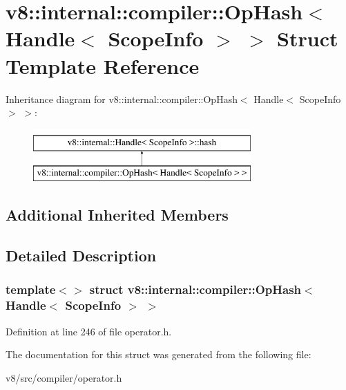 \hypertarget{structv8_1_1internal_1_1compiler_1_1OpHash_3_01Handle_3_01ScopeInfo_01_4_01_4}{}\section{v8\+:\+:internal\+:\+:compiler\+:\+:Op\+Hash$<$ Handle$<$ Scope\+Info $>$ $>$ Struct Template Reference}
\label{structv8_1_1internal_1_1compiler_1_1OpHash_3_01Handle_3_01ScopeInfo_01_4_01_4}
Inheritance diagram for v8\+:\+:internal\+:\+:compiler\+:\+:Op\+Hash$<$ Handle$<$ Scope\+Info $>$ $>$\+:\begin{figure}[H]
\begin{center}
\leavevmode
\includegraphics[height=2.000000cm]{structv8_1_1internal_1_1compiler_1_1OpHash_3_01Handle_3_01ScopeInfo_01_4_01_4}
\end{center}
\end{figure}
\subsection*{Additional Inherited Members}


\subsection{Detailed Description}
\subsubsection*{template$<$$>$\newline
struct v8\+::internal\+::compiler\+::\+Op\+Hash$<$ Handle$<$ Scope\+Info $>$ $>$}



Definition at line 246 of file operator.\+h.



The documentation for this struct was generated from the following file\+:\begin{DoxyCompactItemize}
\item 
v8/src/compiler/operator.\+h\end{DoxyCompactItemize}
